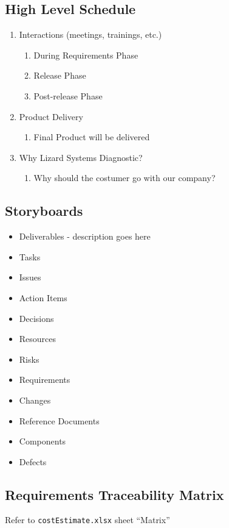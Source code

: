 \documentclass{article}
\begin{document}
\subsection{High Level Schedule}
\begin{enumerate}
\item Interactions (meetings, trainings, etc.)
  \begin{enumerate}
  \item During Requirements Phase
  \item Release Phase
  \item Post-release Phase
  \end{enumerate}
\item Product Delivery
  \begin{enumerate}
  \item Final Product will be delivered
  \end{enumerate}
\item Why Lizard Systems Diagnostic?
  \begin{enumerate}
  \item Why should the costumer go with our company?
  \end{enumerate}
\end{enumerate}

\subsection{Storyboards}
\begin{itemize}
\item Deliverables - description goes here
\item Tasks
\item Issues
\item Action Items
\item Decisions
\item Resources
\item Risks
\item Requirements
\item Changes
\item Reference Documents
\item Components
\item Defects
\end{itemize}

\subsection{Requirements Traceability Matrix}
Refer to \texttt{costEstimate.xlsx} sheet ``Matrix''
\end{document}
